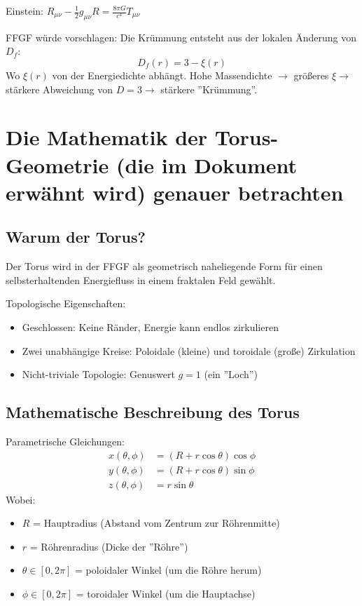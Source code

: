 	Einstein: \( R_{\mu\nu} - \frac{1}{2}g_{\mu\nu}R = \frac{8\pi G}{c^4} T_{\mu\nu} \)
	
	FFGF würde vorschlagen: Die Krümmung entsteht aus der lokalen Änderung von \( D_f \):
	\[
	D_f(r) = 3 - \xi(r)
	\]
	Wo \( \xi(r) \) von der Energiedichte abhängt. Hohe Massendichte \( \rightarrow \) größeres \( \xi \rightarrow \) stärkere Abweichung von \( D=3 \rightarrow \) stärkere ''Krümmung''.
	
	\section{Die Mathematik der Torus-Geometrie (die im Dokument erwähnt wird) genauer betrachten}
	\subsection{Warum der Torus?}
	Der Torus wird in der FFGF als geometrisch naheliegende Form für einen selbsterhaltenden Energiefluss in einem fraktalen Feld gewählt.
	
	Topologische Eigenschaften:
	\begin{itemize}
		\item Geschlossen: Keine Ränder, Energie kann endlos zirkulieren
		\item Zwei unabhängige Kreise: Poloidale (kleine) und toroidale (große) Zirkulation
		\item Nicht-triviale Topologie: Genuswert \( g = 1 \) (ein ''Loch'')
	\end{itemize}
	
	\subsection{Mathematische Beschreibung des Torus}
	Parametrische Gleichungen:
	\begin{align}
		x(\theta, \phi) &= (R + r \cos \theta) \cos \phi \\
		y(\theta, \phi) &= (R + r \cos \theta) \sin \phi \\
		z(\theta, \phi) &= r \sin \theta
	\end{align}
	Wobei:
	\begin{itemize}
		\item \( R \) = Hauptradius (Abstand vom Zentrum zur Röhrenmitte)
		\item \( r \) = Röhrenradius (Dicke der ''Röhre'')
		\item \( \theta \in [0, 2\pi] \) = poloidaler Winkel (um die Röhre herum)
		\item \( \phi \in [0, 2\pi] \) = toroidaler Winkel (um die Hauptachse)
	\end{itemize}
	
